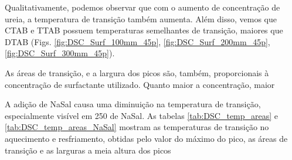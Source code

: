 			
		Qualitativamente, podemos observar que com o aumento de concentração de ureia, a temperatura de transição também aumenta. Além disso, vemos que CTAB e TTAB possuem temperaturas semelhantes de transição, maiores que DTAB (Figs. \ref{fig:DSC_Surf_100mm_45p}, \ref{fig:DSC_Surf_200mm_45p}, \ref{fig:DSC_Surf_300mm_45p}).
		
		
		As áreas de transição, e a largura dos picos são, também, proporcionais à concentração de surfactante utilizado. Quanto maior a concentração, maior 
		
		 A adição de NaSal causa uma diminuição na temperatura de transição, especialmente visível em 250\mM{} de NaSal. As tabelas \ref{tab:DSC_temp_areas} e \ref{tab:DSC_temp_areas_NaSal} mostram as temperaturas de transição no aquecimento e resfriamento, obtidas pelo valor do máximo do pico, as áreas de transição e as larguras a meia altura dos picos 

